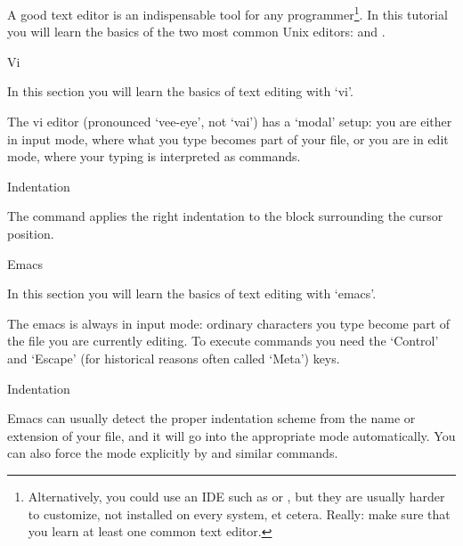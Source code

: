 
A good text editor is an indispensable tool for any
programmer\footnote {Alternatively, you could use an \acf{IDE} such as
 or , but they are
usually harder to customize, not installed on every system, et
cetera. Really: make sure that you learn at least one common text
editor.}. In this tutorial you will learn the basics of the two most
common Unix editors:  and .

 {Vi}

\begin{purpose}
  In this section you will learn the basics of text editing with `vi'.
\end{purpose}

The vi editor (pronounced `vee-eye', not `vai') has a `modal' setup:
you are either in input mode, where what you type becomes part of your
file, or you are in edit mode, where your typing is interpreted as
commands.

 {Indentation}

The command \n{[[=]]} applies the right indentation to the block
surrounding the cursor position.


 {Emacs}

\begin{purpose}
  In this section you will learn the basics of text editing with `emacs'.
\end{purpose}

The emacs is always in input mode: ordinary characters you type become
part of the file you are currently editing. To execute commands you
need the `Control' and `Escape' (for historical reasons often called
`Meta') keys.

 {Indentation}

Emacs can usually detect the proper indentation scheme from the
name or extension of your file, and it will go into the appropriate
mode automatically. You can also force the mode explicitly by  and similar commands.

